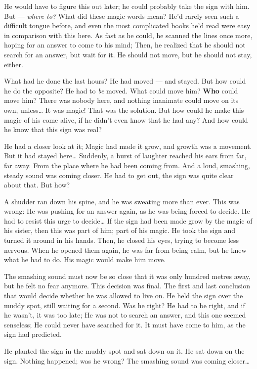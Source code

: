 He would have to figure this out later; he could probably take the sign with him.
But --- \emph{where to?} 
What did these magic words mean? He'd rarely seen such a difficult tongue before, and even the most complicated books he'd read were easy in comparison with this here. 
As fast as he could, he scanned the lines once more, hoping for an answer to come to his mind; Then, he realized that he should not search for an answer, but wait for it. 
He should not move, but he should not stay, either.

What had he done the last hours? He had moved --- and stayed. But how could he do the opposite? 
He had to \emph{be} moved. What could move him? \textbf{Who} could move him? There was nobody here, and nothing inanimate could move on its own, unless\dots{}
It was magic! That was the solution. But how could he make this magic of his come alive, if he didn't even know that he had any?
And how could he know that this sign was real?

He had a closer look at it; Magic had made it grow, and growth was a movement. But it had stayed here\dots{}
Suddenly, a burst of laughter reached his ears from far, far away. 
From the place where he had been coming from. 
And a loud, smashing, steady sound was coming closer. He had to get out, the sign was quite clear about that. But how?

A shudder ran down his spine, and he was sweating more than ever. This was wrong: He was pushing for an answer again, as he was being forced to decide. He had to resist this urge to decide\dots{}
If the sign had been made grow by the magic of his sister, then this was part of him; part of his magic.
He took the sign and turned it around in his hands. Then, he closed his eyes, trying to become less nervous. When he opened them again, he was far from being calm, but he knew what he had to do. 
His magic would make him move.

The smashing sound must now be so close that it was only hundred metres away, but he felt no fear anymore. This decision was final. 
The first and last conclusion that would decide whether he was allowed to live on. 
He held the sign over the muddy spot, still waiting for a second. Was he right? He had to be right, and if he wasn't, it was too late; He was not to search an answer, and this one seemed senseless; He could never have searched for it. 
It must have come to him, as the sign had predicted.

He planted the sign in the muddy spot and sat down on it. He sat down on the sign. Nothing happened; was he wrong? 
The smashing sound was coming closer\dots{}

